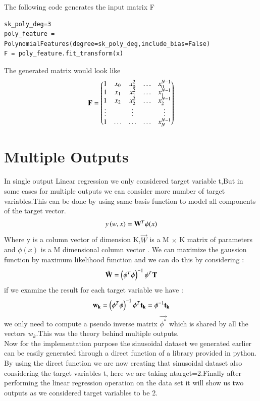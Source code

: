 \documentclass[journal,12pt,twocolumn]{IEEEtran}
\begin{document}
The following code generates the input matrix F
\begin{lstlisting}
sk_poly_deg=3
poly_feature = PolynomialFeatures(degree=sk_poly_deg,include_bias=False)
F = poly_feature.fit_transform(x)
\end{lstlisting}
The generated matrix would look like
\begin{align}
    \mathbf{F}= \begin{pmatrix} 1 & x_{0} & x_{0}^2 & \ldots & x_{0}^{N-1} \\
		1 & x_{1} & x_{1}^2 & \ldots & x_{1}^{N-1} \\
		1 & x_{2} & x_{2}^2 & \ldots & x_{2}^{N-1} \\
		\vdots & & \vdots &  & \vdots  \\
		    1 & \ldots & \ldots & \ldots & x_{N}^{N-1} \end{pmatrix}\label{eq:12}
\end{align}
\section{Multiple Outputs}
In single output Linear regression we only considered target variable t,But in some cases for multiple outputs we can consider more number of target variables.This can be done by using same basis function to model all components of the target vector.
\begin{align}
     y\left(w,x\right)= \mathbf{W}^{T} \phi (x)\\
\end{align}
Where y is a column vector of dimension K,$\vec{W}$ is a M $\times$ K matrix of parameters and $\phi(x)$ is a M dimensional column vector . 
We can maximize the gaussion function by maximum likelihood function and we can do this by considering :  
\begin{align}
    \hat{\mathbf{W}} = \left(\mathbf{\phi}^T\mathbf{\phi}\right)^{-1}\mathbf{\phi}^T\mathbf{T} \label{eq:13}
\end{align}
if we examine the result for each target variable we have :
\begin{align}
    \vec{w_{k}}=\brak{\vec{\phi}^T\vec{\phi}}^{-1}\vec{\phi}^T\vec{t_{k}}=\vec{\phi}^{-1}\Vec{t_{k}}
\end{align}
we only need to compute a pseudo inverse matrix $\Vec{\phi^{*}}$ which is shared by all the vectors $w_{k}$.This was the theory behind multiple outputs.\\
Now for the implementation purpose the sinusoidal dataset we generated earlier can be easily generated through a direct function of a library provided in python. By using the direct function we are now creating that sinusoidal dataset also considering the target variables t, here we are taking n\textunderscore target=2.Finally after performing the linear regression operation on the data set it will show us two outputs as we considered target variables to be 2.
\end{document}
